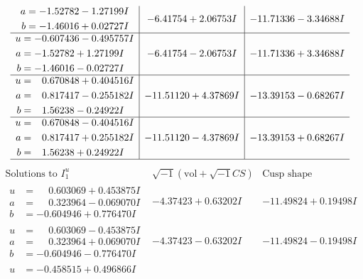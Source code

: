 \documentclass[1p]{elsarticle_modified}
\theoremstyle{definition}
\newcommand{\I}{\sqrt{-1}}
\begin{document}
$$\begin{array}{c|c|c}
\begin{aligned}
a &= -1.52782 - 1.27199 I \\
b &= -1.46016 + 0.02727 I\end{aligned}
 & -6.41754 + 2.06753 I & -11.71336 - 3.34688 I \\ \hline\begin{aligned}
u &= -0.607436 - 0.495757 I \\
a &= -1.52782 + 1.27199 I \\
b &= -1.46016 - 0.02727 I\end{aligned}
 & -6.41754 - 2.06753 I & -11.71336 + 3.34688 I \\ \hline\begin{aligned}
u &= \phantom{-}0.670848 + 0.404516 I \\
a &= \phantom{-}0.817417 - 0.255182 I \\
b &= \phantom{-}1.56238 - 0.24922 I\end{aligned}
 & -11.51120 + 4.37869 I & -13.39153 - 0.68267 I \\ \hline\begin{aligned}
u &= \phantom{-}0.670848 - 0.404516 I \\
a &= \phantom{-}0.817417 + 0.255182 I \\
b &= \phantom{-}1.56238 + 0.24922 I\end{aligned}
 & -11.51120 - 4.37869 I & -13.39153 + 0.68267 I\\
 \hline 
 \end{array}$$\newpage$$\begin{array}{c|c|c}  
\text{Solutions to }I^u_{1}& \I (\text{vol} + \sqrt{-1}CS) & \text{Cusp shape}\\
 \hline 
\begin{aligned}
u &= \phantom{-}0.603069 + 0.453875 I \\
a &= \phantom{-}0.323964 - 0.069070 I \\
b &= -0.604946 + 0.776470 I\end{aligned}
 & -4.37423 + 0.63202 I & -11.49824 + 0.19498 I \\ \hline\begin{aligned}
u &= \phantom{-}0.603069 - 0.453875 I \\
a &= \phantom{-}0.323964 + 0.069070 I \\
b &= -0.604946 - 0.776470 I\end{aligned}
 & -4.37423 - 0.63202 I & -11.49824 - 0.19498 I \\ \hline\begin{aligned}
u &= -0.458515 + 0.496866 I \\

\end{aligned}
\end{array}$$
\end{document}
